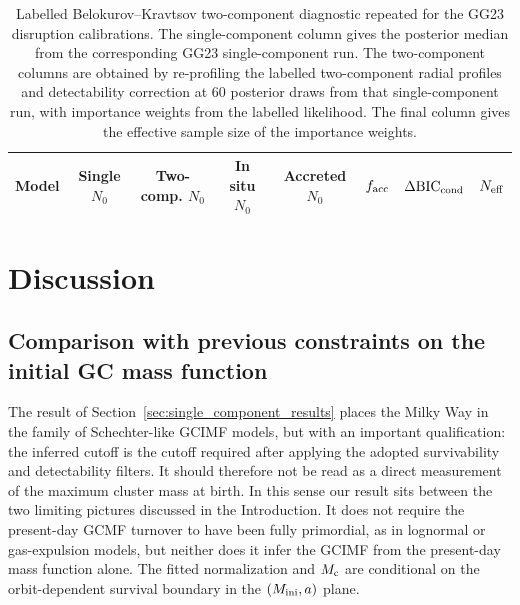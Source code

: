 \documentclass[fleqn,usenatbib]{mnras}
\begin{document}
\begin{table}
    \centering
    \caption{Labelled Belokurov--Kravtsov two-component diagnostic repeated for the GG23 disruption calibrations. The single-component column gives the posterior median from the corresponding GG23 single-component run. The two-component columns are obtained by re-profiling the labelled two-component radial profiles and detectability correction at 60 posterior draws from that single-component run, with importance weights from the labelled likelihood. The final column gives the effective sample size of the importance weights.}
    \label{tab:gg23_bk_two_component}
    \scriptsize
    \begin{tabular}{lccccccc}
        \hline
        Model & Single $N_0$ & Two-comp. $N_0$ & In situ $N_0$ & Accreted $N_0$ & $f_{\rm acc}$ & $\Delta\mathrm{BIC}_{\rm cond}$ & $N_{\rm eff}$ \\
        \hline
        
    \end{tabular}
\end{table}

\clearpage

\section{Discussion}\label{sec:discussion}

\subsection{Comparison with previous constraints on the initial GC mass function}\label{sec:discussion_literature}
The result of Section~\ref{sec:single_component_results} places the Milky Way in the family of Schechter-like GCIMF models, but with an important qualification: the inferred cutoff is the cutoff required after applying the adopted survivability and detectability filters. It should therefore not be read as a direct measurement of the maximum cluster mass at birth. In this sense our result sits between the two limiting pictures discussed in the Introduction. It does not require the present-day GCMF turnover to have been fully primordial, as in lognormal or gas-expulsion models, but neither does it infer the GCIMF from the present-day mass function alone. The fitted normalization and $M_{\rm c}$ are conditional on the orbit-dependent survival boundary in the $(M_{\rm ini},a)$ plane.
\end{document}
